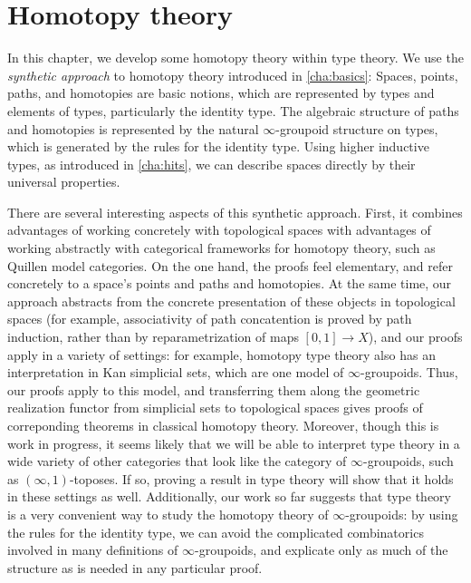 \chapter{Homotopy theory}
\label{cha:homotopy}

In this chapter, we develop some homotopy theory within type theory.  We
use the \emph{synthetic approach} to homotopy theory introduced in
\cref{cha:basics}: Spaces, points, paths, and homotopies are basic
notions, which are represented by types and elements of types, particularly
the identity type.  The algebraic structure of paths and homotopies is
represented by the natural $\infty$-groupoid structure on types, which is generated
by the rules for the identity type.  Using higher inductive types, as
introduced in \cref{cha:hits}, we can describe spaces directly by their
universal properties.  

There are several interesting aspects of this synthetic approach.
First, it combines advantages of working concretely with topological
spaces with advantages of working abstractly with categorical frameworks
for homotopy theory, such as Quillen model categories.  On the one hand,
the proofs feel elementary, and refer concretely to a space's
points and paths and homotopies.  At the same time, our approach abstracts from
the concrete presentation of these objects in topological spaces (for example,
associativity of path concatention is proved by path induction, rather
than by reparametrization of maps $[0,1] \to X$), and our proofs apply
in a variety of settings: for example, homotopy type theory also has an interpretation in
Kan simplicial sets, which are one model of $\infty$-groupoids.  Thus,
our proofs apply to this model, and transferring them along the geometric
realization functor from simplicial sets to topological spaces gives
proofs of  correponding theorems in classical homotopy theory.
Moreover, though this is work in progress, it seems likely that we will
be able to interpret type theory in a wide variety of other categories
that look like the category of $\infty$-groupoids, such as
$(\infty,1)$-toposes. If so, proving a result in type theory will show
that it holds in these settings as well.  Additionally, our work so far
suggests that type theory is a very convenient way to study the homotopy theory
of $\infty$-groupoids: by using the rules for the identity type, we
can avoid the complicated combinatorics involved in many definitions of
$\infty$-groupoids, and explicate only as much of the
structure as is needed in any particular proof.  

